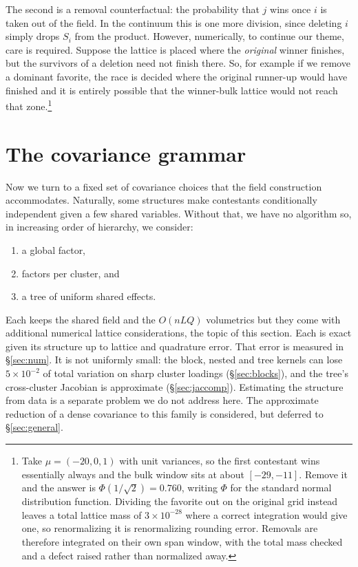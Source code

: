 \documentclass[11pt]{article}
\begin{document}
The second is a removal counterfactual: the probability that $j$ wins
once $i$ is taken out of the field. In the continuum this is one more
division, since deleting $i$ simply drops $S_i$ from the product. However, numerically, to continue our theme, care is required. Suppose the lattice is placed where the
\emph{original} winner finishes, but the survivors of a deletion need not
finish there. So, for example if we remove a dominant favorite, the race is decided where the original runner-up would have finished and it is entirely possible that the winner-bulk lattice would not reach that zone.\footnote{
Take $\mu=(-20,0,1)$ with unit variances, so the first contestant wins
essentially always and the bulk window sits at about $[-29,-11]$. Remove
it and the answer is $\Phi(1/\sqrt2)=0.760$, writing $\Phi$ for the
standard normal distribution function. Dividing the favorite out on the
original grid instead leaves a total lattice mass of $3\times10^{-28}$
where a correct integration would give one, so renormalizing it is
renormalizing rounding error. Removals are therefore integrated on their
own span window, with the total mass checked and a defect raised rather
than normalized away.}



\section{The covariance grammar}\label{sec:grammar}

Now we turn to a fixed set of covariance choices that the field construction accommodates. Naturally, some structures make contestants conditionally independent given a few shared variables. Without that, we have no algorithm so, in increasing order of hierarchy, we consider:
\begin{enumerate}
\item a global factor,
\item factors per cluster, and
\item a tree of uniform shared effects.
\end{enumerate}
Each keeps the shared
field and the $O(nLQ)$ volumetrics but they come with additional numerical lattice considerations, the topic of this section. Each is exact given its structure up to lattice and quadrature error.
That error is measured in \S\ref{sec:num}. It is not uniformly small: the
block, nested and tree kernels can lose $5\times10^{-2}$ of total
variation on sharp cluster loadings (\S\ref{sec:blocks}), and the tree's
cross-cluster Jacobian is approximate (\S\ref{sec:jaccomp}).
Estimating the structure from data is a separate problem we do not address
here. The approximate reduction of a dense covariance to this family is considered, but deferred to \S\ref{sec:general}.
\end{document}
